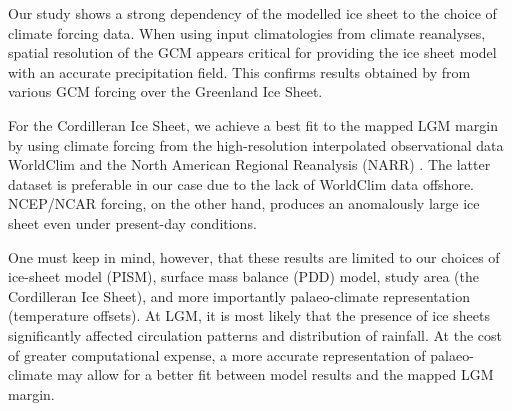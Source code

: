 \conclusions
\label{sec:concl}

Our study shows a strong dependency of the modelled ice sheet to the choice of climate forcing data. When using input climatologies from climate reanalyses, spatial resolution of the GCM appears critical for providing the ice sheet model with an accurate precipitation field. This confirms results obtained by \citet{quiquet-etal-2012} from various GCM forcing over the Greenland Ice Sheet.

For the Cordilleran Ice Sheet, we achieve a best fit to the mapped LGM margin by \citet{dyke-2004} using climate forcing from the high-resolution interpolated observational data WorldClim \citep{data:worldclim} and the North American Regional Reanalysis (NARR) \citep{data:narr}. The latter dataset is preferable in our case due to the lack of WorldClim data offshore. NCEP/NCAR forcing, on the other hand, produces an anomalously large ice sheet even under present-day conditions. 

One must keep in mind, however, that these results are limited to our choices of ice-sheet model (PISM), surface mass balance (PDD) model, study area (the Cordilleran Ice Sheet), and more importantly palaeo-climate representation (temperature offsets). At LGM, it is most likely that the presence of ice sheets significantly affected circulation patterns and distribution of rainfall. At the cost of greater computational expense, a more accurate representation of palaeo-climate may allow for a better fit between model results and the mapped LGM margin.
